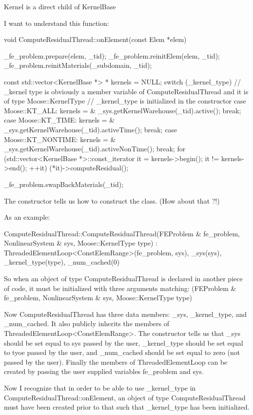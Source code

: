 {Kernel is a direct child of KernelBase

I want to understand this function:

void
ComputeResidualThread::onElement(const Elem *elem)
{
  _fe_problem.prepare(elem, _tid);
  _fe_problem.reinitElem(elem, _tid);
  _fe_problem.reinitMaterials(_subdomain, _tid);

  const std::vector<KernelBase *> * kernels = NULL;
  switch (_kernel_type)
  // _kernel type is obviously a member variable of ComputeResidualThread and it is of type Moose::KernelType
  // _kernel_type is initialized in the constructor
  {
  case Moose::KT_ALL: kernels = & _sys.getKernelWarehouse(_tid).active(); break;
  case Moose::KT_TIME: kernels = & _sys.getKernelWarehouse(_tid).activeTime(); break;
  case Moose::KT_NONTIME: kernels = & _sys.getKernelWarehouse(_tid).activeNonTime(); break;
  }
  for (std::vector<KernelBase *>::const_iterator it = kernels->begin(); it != kernels->end(); ++it)
  {
    (*it)->computeResidual();
  }

  _fe_problem.swapBackMaterials(_tid);
}

The constructor tells us how to construct the class. (How about that ?!)

As an example:

ComputeResidualThread::ComputeResidualThread(FEProblem & fe_problem, NonlinearSystem & sys, Moose::KernelType type) :
    ThreadedElementLoop<ConstElemRange>(fe_problem, sys),
    _sys(sys),
    _kernel_type(type),
    _num_cached(0)
{
}

So when an object of type ComputeResidualThread is declared in another piece of code, it must be initialized with three arguments matching: (FEProblem & fe_problem, NonlinearSystem & sys, Moose::KernelType type)

Now ComputeResidualThread has three data members: _sys, _kernel_type, and _num_cached. It also publicly inherits the members of ThreadedElementLoop<ConstElemRange>. The constructor tells us that _sys should be set equal to sys passed by the user, _kernel_type should be set equal to tyoe passed by the user, and _num_cached should be set equal to zero (not passed by the user). Finally the members of ThreadedElementLoop can be created by passing the user supplied variables fe_problem and sys.

Now I recognize that in order to be able to use _kernel_type in ComputeResidualThread::onElement, an object of type ComputeResidualThread must have been created prior to that such that _kernel_type has been initialized.

}
